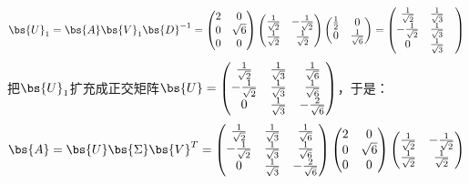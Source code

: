 \documentclass[12pt, a4paper, oneside, UTF8]{ctexbook}
\begin{document}
\begin{solution}
\begin{enumerate}[label=(\arabic*)]
        \begin{align*}
            \bs{U}_1=\bs{A}\bs{V}_1\bs{D}^{-1}=
            \begin{pmatrix}
                2 & 0\\
                0 & \sqrt{6} \\
                0 & 0
            \end{pmatrix}\begin{pmatrix}
                \frac{1}{\sqrt{2}}&-\frac{1}{\sqrt{2}}\\
            \frac{1}{\sqrt{2}}&\frac{1}{\sqrt{2}}
            \end{pmatrix} \begin{pmatrix}
                \frac{1}{2}& 0\\
                0& \frac{1}{\sqrt{6}}
            \end{pmatrix}=\begin{pmatrix}
                \frac{1}{\sqrt{2}}&\frac{1}{\sqrt{3}}\\
                -\frac{1}{\sqrt{2}}&\frac{1}{\sqrt{3}}\\
                0&\frac{1}{\sqrt{3}}&
            \end{pmatrix}
        \end{align*}
        把$\bs{U}_1$扩充成正交矩阵$\bs{U}=\begin{pmatrix}
            \frac{1}{\sqrt{2}}&\frac{1}{\sqrt{3}}&\frac{1}{\sqrt{6}}\\
            -\frac{1}{\sqrt{2}}&\frac{1}{\sqrt{3}}&\frac{1}{\sqrt{6}}\\
            0&\frac{1}{\sqrt{3}}&-\frac{2}{\sqrt{6}}
        \end{pmatrix}$，于是：
        \begin{align*}
            \bs{A}=\bs{U}\bs{\Sigma}\bs{V}^T=\begin{pmatrix}
                \frac{1}{\sqrt{2}}&\frac{1}{\sqrt{3}}&\frac{1}{\sqrt{6}}\\
                -\frac{1}{\sqrt{2}}&\frac{1}{\sqrt{3}}&\frac{1}{\sqrt{6}}\\
                0&\frac{1}{\sqrt{3}}&-\frac{2}{\sqrt{6}}
            \end{pmatrix}
            \begin{pmatrix}
                2 & 0\\
                0 & \sqrt{6} \\
                0 & 0
            \end{pmatrix}
            \begin{pmatrix}
                \frac{1}{\sqrt{2}}&-\frac{1}{\sqrt{2}}\\
                \frac{1}{\sqrt{2}}&\frac{1}{\sqrt{2}}
            \end{pmatrix}
        \end{align*}


\end{enumerate}
\end{solution}
\end{document}
